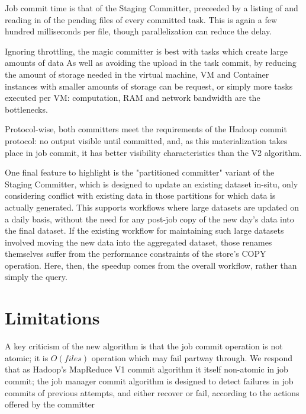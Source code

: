 \documentclass[9pt,technote]{IEEEtran}
\begin{document}
Job commit time is that of the Staging Committer, preceeded by a listing
of and reading in of the pending files of every committed task.
This is again a few hundred milliseconds per file, though parallelization
can reduce the delay.

Ignoring throttling, the magic committer is best with tasks which create
large amounts of data
As well as avoiding the upload in the task commit, by reducing the
amount of storage needed in the virtual machine, VM and Container instances
with smaller amounts of storage can be request, or simply more tasks executed
per VM: computation, RAM and network bandwidth are the bottlenecks.

Protocol-wise, both committers meet the requirements of the Hadoop commit
protocol: no output visible until committed, and, as this materialization
takes place in job commit, it has better visibility characteristics than
the V2 algorithm.

One final feature to highlight is the "partitioned committer" variant
of the Staging Committer, which is designed to update an existing
dataset in-situ, only considering conflict with existing data in
those partitions for which data is actually generated.
This supports workflows where large datasets are updated on a daily basis,
without the need for any post-job copy of the new day's data into the
final dataset.
If the existing workflow for maintaining such large datasets involved
moving the new data into the aggregated dataset, those renames themselves
suffer from the performance constraints of the store's COPY operation.
Here, then, the speedup comes from the overall workflow, rather than
simply the query.






\section{Limitations}
\label{sec:limitations}

A key criticism of the new algorithm is that the job commit operation is not atomic;
it is $O(files)$ operation which may fail partway through.
We respond that as Hadoop's MapReduce V1 commit algorithm it itself non-atomic in job commit;
the job manager commit algorithm is designed to detect failures in job commits
of previous attempts, and either recover or fail, according to the actions
offered by the committer
\end{document}
